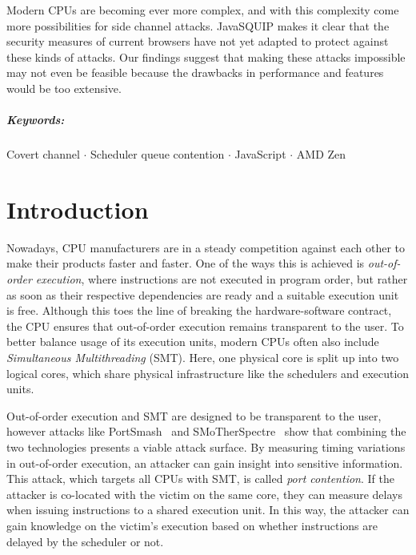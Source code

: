 \documentclass[11pt,
  titlepage=false,
  parskip=half,      %
]{scrreprt}
\begin{document}
Modern CPUs are becoming ever more complex, and with this complexity come more possibilities for side channel attacks.
JavaSQUIP makes it clear that the security measures of current browsers have not yet adapted to protect against these kinds of attacks.
Our findings suggest that making these attacks impossible may not even be feasible because the drawbacks in performance and features would be too extensive.
\paragraph{Keywords:}
Covert channel $\cdot$
Scheduler queue contention $\cdot$
JavaScript $\cdot$
AMD Zen

\clearpage


\chapter{Introduction}
\label{ch:introduction}

Nowadays, CPU manufacturers are in a steady competition against each other to make their products faster and faster.
One of the ways this is achieved is \textit{out-of-order execution}, where instructions are not executed in program order,
but rather as soon as their respective dependencies are ready and a suitable execution unit is free.
Although this toes the line of breaking the hardware-software contract, the CPU ensures that out-of-order execution remains transparent to the user.
To better balance usage of its execution units, modern CPUs often also include \textit{Simultaneous Multithreading} (SMT).
Here, one physical core is split up into two logical cores, which share physical infrastructure like the schedulers and execution units.

Out-of-order execution and SMT are designed to be transparent to the user, however attacks like
PortSmash~\cite{Aldaya2019port} and SMoTherSpectre~\cite{Bhattacharyya2019} show that combining the two technologies presents a viable attack surface.
By measuring timing variations in out-of-order execution, an attacker can gain insight into sensitive information.
This attack, which targets all CPUs with SMT, is called \textit{port contention}.
If the attacker is co-located with the victim on the same core, they can measure delays when issuing instructions to a shared execution unit.
In this way, the attacker can gain knowledge on the victim's execution based on whether instructions are delayed by the scheduler or not.
\end{document}
